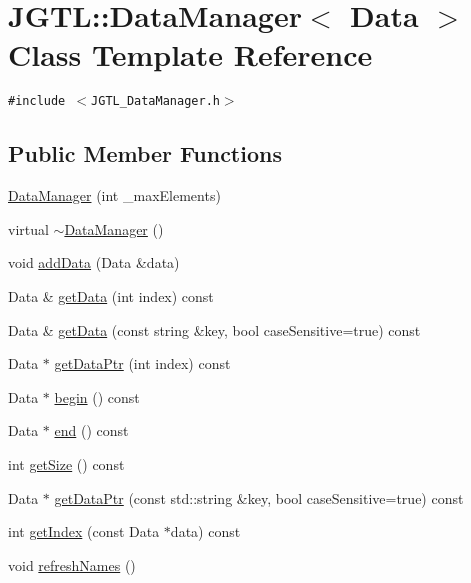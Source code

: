 \hypertarget{class_j_g_t_l_1_1_data_manager}{
\section{JGTL::Data\-Manager$<$ Data $>$ Class Template Reference}
\label{class_j_g_t_l_1_1_data_manager}
}
{\tt \#include $<$JGTL\_\-Data\-Manager.h$>$}

\subsection*{Public Member Functions}
\begin{CompactItemize}
\item 
\hyperlink{class_j_g_t_l_1_1_data_manager_ad25adf4d2c94622679097e1213d835c}{Data\-Manager} (int \_\-max\-Elements)
\item 
virtual \hyperlink{class_j_g_t_l_1_1_data_manager_6055cf850702d6462aeaf05e0705d060}{$\sim$Data\-Manager} ()
\item 
void \hyperlink{class_j_g_t_l_1_1_data_manager_67daf4c2ff45ed86ee52295355fa7aa6}{add\-Data} (Data \&data)
\item 
Data \& \hyperlink{class_j_g_t_l_1_1_data_manager_e74ffb480046ea8c78a6cd3bd90b0c49}{get\-Data} (int index) const
\item 
Data \& \hyperlink{class_j_g_t_l_1_1_data_manager_79748c8bd3a3ede098c3ebffe0357a98}{get\-Data} (const string \&key, bool case\-Sensitive=true) const 
\item 
Data $\ast$ \hyperlink{class_j_g_t_l_1_1_data_manager_f5abfb945d321d19c19ad94e3e4ca6f9}{get\-Data\-Ptr} (int index) const
\item 
Data $\ast$ \hyperlink{class_j_g_t_l_1_1_data_manager_23842ccd54e7f6e33035635181a533fd}{begin} () const
\item 
Data $\ast$ \hyperlink{class_j_g_t_l_1_1_data_manager_58cae71a92dc49f2cf7b051b1153afd3}{end} () const
\item 
int \hyperlink{class_j_g_t_l_1_1_data_manager_f4f37d5da6b7a6b1bd27378249fbf778}{get\-Size} () const
\item 
Data $\ast$ \hyperlink{class_j_g_t_l_1_1_data_manager_6551f27a6d72f21451ea061ac975f017}{get\-Data\-Ptr} (const std::string \&key, bool case\-Sensitive=true) const
\item 
int \hyperlink{class_j_g_t_l_1_1_data_manager_401f692c79570aaef1e179d12f884758}{get\-Index} (const Data $\ast$data) const 
\item 
void \hyperlink{class_j_g_t_l_1_1_data_manager_f588204810497ad82506075bea7c3ccc}{refresh\-Names} ()
\end{CompactItemize}
